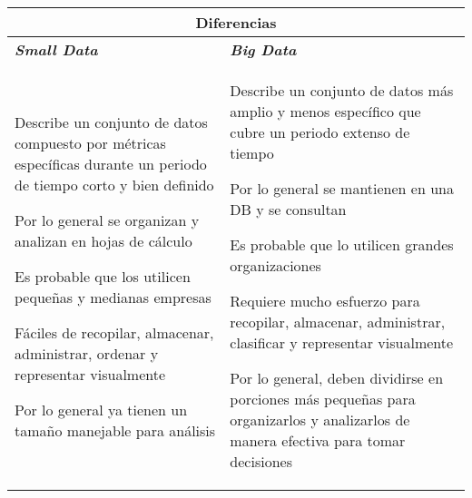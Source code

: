 \begin{table}
    \centering
    \begin{tabular}{|p{7cm}|p{7cm}|}
        \hline
        \multicolumn{2}{|c|}{Diferencias} \\
        \hline
        \textbf{\textit{Small Data}} & \textbf{\textit{Big Data}} \\
        \hline
        \begin{description}
            \item {Describe un conjunto de datos compuesto por métricas específicas durante un periodo de tiempo corto y bien definido}
            \item {Por lo general se organizan y analizan en hojas de cálculo}
            \item {Es probable que los utilicen pequeñas y medianas empresas}
            \item {Fáciles de recopilar, almacenar, administrar, ordenar y representar visualmente}
            \item {Por lo general ya tienen un tamaño manejable para análisis}
        \end{description} & \begin{description}
            \item {Describe un conjunto de datos más amplio y menos específico que cubre un periodo extenso de tiempo}
            \item {Por lo general se mantienen en una DB y se consultan}
            \item {Es probable que lo utilicen grandes organizaciones}
            \item {Requiere mucho esfuerzo para recopilar, almacenar, administrar, clasificar y representar visualmente}
            \item {Por lo general, deben dividirse en porciones más pequeñas para organizarlos y analizarlos de manera efectiva para tomar decisiones}
        \end{description} \\
        \hline
    \end{tabular}
\end{table}
\newpage

